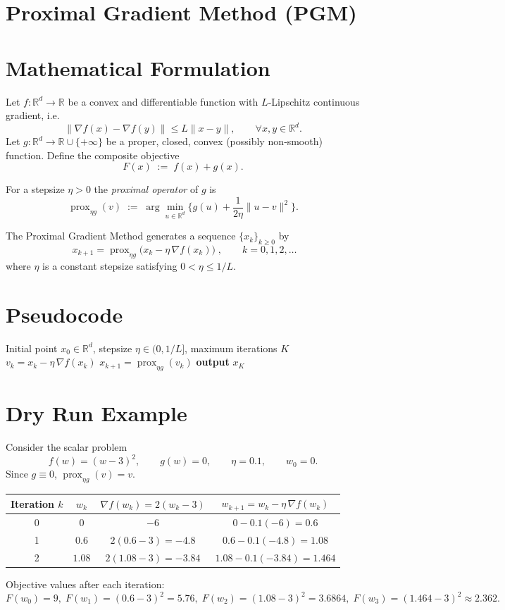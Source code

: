 \documentclass{article}
\newcommand{\prox}{\operatorname{prox}}
\newcommand{\grad}{\nabla}
\begin{document}
\section*{Proximal Gradient Method (PGM)}

\section*{Mathematical Formulation}
Let $f:\mathbb{R}^{d}\rightarrow\mathbb{R}$ be a convex and differentiable function with $L$‑Lipschitz continuous gradient, i.e.
\[
\|\grad f(x)-\grad f(y)\|\le L\|x-y\|,\qquad\forall x,y\in\mathbb{R}^{d}.
\]
Let $g:\mathbb{R}^{d}\rightarrow\mathbb{R}\cup\{+\infty\}$ be a proper, closed, convex (possibly non‑smooth) function.  
Define the composite objective
\[
F(x)\;:=\;f(x)+g(x).
\]

For a stepsize $\eta>0$ the \emph{proximal operator} of $g$ is
\[
\prox_{\eta g}(v)\;:=\;\arg\min_{u\in\mathbb{R}^{d}}\Big\{ g(u)+\frac{1}{2\eta}\|u-v\|^{2}\Big\}.
\]

The Proximal Gradient Method generates a sequence $\{x_k\}_{k\ge0}$ by
\begin{equation}
\boxed{\;x_{k+1}= \prox_{\eta g}\bigl(x_k-\eta\,\grad f(x_k)\bigr)\;},
\qquad k=0,1,2,\dots
\tag{PGM}
\end{equation}
where $\eta$ is a constant stepsize satisfying $0<\eta\le 1/L$.

\section*{Pseudocode}
\begin{algorithm}[H]
\caption{Proximal Gradient Method}
\begin{algorithmic}[1]
\Require Initial point $x_{0}\in\mathbb{R}^{d}$, stepsize $\eta\in(0,1/L]$, maximum iterations $K$
    \State $v_{k}=x_{k}-\eta\,\grad f(x_{k})$
    \State $x_{k+1}= \prox_{\eta g}(v_{k})$
\EndFor
\State \textbf{output} $x_{K}$
\end{algorithmic}
\end{algorithm}

\section*{Dry Run Example}
Consider the scalar problem
\[
f(w)=(w-3)^{2},\qquad g(w)=0,\qquad \eta=0.1,\qquad w_{0}=0.
\]
Since $g\equiv0$, $\prox_{\eta g}(v)=v$.

\begin{center}
\begin{tabular}{c|c|c|c}
Iteration $k$ & $w_k$ & $\grad f(w_k)=2(w_k-3)$ & $w_{k+1}=w_k-\eta\,\grad f(w_k)$\\ \hline
0 & $0$ & $-6$ & $0-0.1(-6)=0.6$\\
1 & $0.6$ & $2(0.6-3)=-4.8$ & $0.6-0.1(-4.8)=1.08$\\
2 & $1.08$ & $2(1.08-3)=-3.84$ & $1.08-0.1(-3.84)=1.464$\\
\end{tabular}
\end{center}
Objective values after each iteration:
\[
F(w_0)=9,\;F(w_1)=(0.6-3)^2=5.76,\;F(w_2)=(1.08-3)^2=3.6864,\;F(w_3)=(1.464-3)^2\approx2.362.
\]
\end{document}
